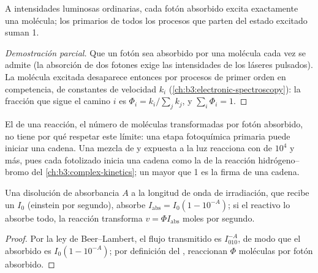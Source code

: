\begin{proposition}\label{prop:b3:photochemistry:stark-einstein}
A intensidades luminosas ordinarias, cada fotón absorbido excita exactamente una
molécula; los  primarios de todos los procesos que parten del
estado excitado suman 1.
\end{proposition}

\begin{proof}[Demostración parcial]
Que un fotón sea absorbido por una molécula cada vez se admite (la absorción de dos fotones
exige las intensidades de los láseres pulsados). La molécula excitada
desaparece entonces por procesos de primer orden en competencia, de constantes de velocidad $k_i$
(\cref{ch:b3:electronic-spectroscopy}): la fracción que sigue el camino $i$ es $\Phi_i =
k_i/\sum_jk_j$, y $\sum_i\Phi_i = 1$.
\end{proof}

El  de una reacción, el número de moléculas transformadas por fotón
absorbido, no tiene por qué respetar este límite: una etapa fotoquímica primaria puede iniciar una
cadena. Una mezcla de  y  expuesta a la luz reacciona con 
de $10^4$ y más, pues cada  fotolizado inicia una cadena como la de la
reacción hidrógeno--bromo del \cref{ch:b3:complex-kinetics}; un 
mayor que 1 es la firma de una cadena.

\begin{proposition}\label{prop:b3:photochemistry:rate}
Una disolución de absorbancia $A$ a la longitud de onda de irradiación, que recibe un  $I_0$ (einstein por segundo), absorbe $I_{\mathrm{abs}} = I_0(1 - 10^{-A})$; si el
reactivo lo absorbe todo, la reacción transforma $v = \Phi I_{\mathrm{abs}}$ moles por segundo.
\end{proposition}

\begin{proof}
Por la ley de Beer--Lambert, el flujo transmitido es $I_010^{-A}$, de modo que el absorbido
es $I_0(1 - 10^{-A})$; por definición del , reaccionan $\Phi$ moléculas por
fotón absorbido.
\end{proof}


